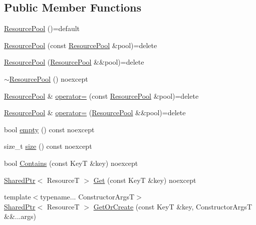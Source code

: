 \subsection*{Public Member Functions}
\begin{DoxyCompactItemize}
\item 
\hyperlink{classmage_1_1_resource_pool_a94aff142869744ed48fb1b426face48b}{Resource\+Pool} ()=default
\item 
\hyperlink{classmage_1_1_resource_pool_ad1cc0cf98317e65900879b85625f10ac}{Resource\+Pool} (const \hyperlink{classmage_1_1_resource_pool}{Resource\+Pool} \&pool)=delete
\item 
\hyperlink{classmage_1_1_resource_pool_a20f2bd146de6ae6902f147cc84792038}{Resource\+Pool} (\hyperlink{classmage_1_1_resource_pool}{Resource\+Pool} \&\&pool)=delete
\item 
\hyperlink{classmage_1_1_resource_pool_ad5dceb2a1cbd47ced5cb6ad269f4510e}{$\sim$\+Resource\+Pool} () noexcept
\item 
\hyperlink{classmage_1_1_resource_pool}{Resource\+Pool} \& \hyperlink{classmage_1_1_resource_pool_accb458f018c38fc154fd3931e0129ad6}{operator=} (const \hyperlink{classmage_1_1_resource_pool}{Resource\+Pool} \&pool)=delete
\item 
\hyperlink{classmage_1_1_resource_pool}{Resource\+Pool} \& \hyperlink{classmage_1_1_resource_pool_a75dbf08b971929eb90d32b38faa3cfb1}{operator=} (\hyperlink{classmage_1_1_resource_pool}{Resource\+Pool} \&\&pool)=delete
\item 
bool \hyperlink{classmage_1_1_resource_pool_aa406e4382ec7047c5576d039d7adc424}{empty} () const noexcept
\item 
size\+\_\+t \hyperlink{classmage_1_1_resource_pool_ab032684a1ed5a782a61f663e269a994a}{size} () const noexcept
\item 
bool \hyperlink{classmage_1_1_resource_pool_a36665c107134816d3e72322e9c80bebd}{Contains} (const KeyT \&key) noexcept
\item 
\hyperlink{namespacemage_a1e01ae66713838a7a67d30e44c67703e}{Shared\+Ptr}$<$ ResourceT $>$ \hyperlink{classmage_1_1_resource_pool_abdd0bc69948404b0185ef7c417e95ff9}{Get} (const KeyT \&key) noexcept
\item 
{\footnotesize template$<$typename... Constructor\+ArgsT$>$ }\\\hyperlink{namespacemage_a1e01ae66713838a7a67d30e44c67703e}{Shared\+Ptr}$<$ ResourceT $>$ \hyperlink{classmage_1_1_resource_pool_a131997439d86fd67cafe4ae6877fce42}{Get\+Or\+Create} (const KeyT \&key, Constructor\+ArgsT \&\&...args)

\end{DoxyCompactItemize}
